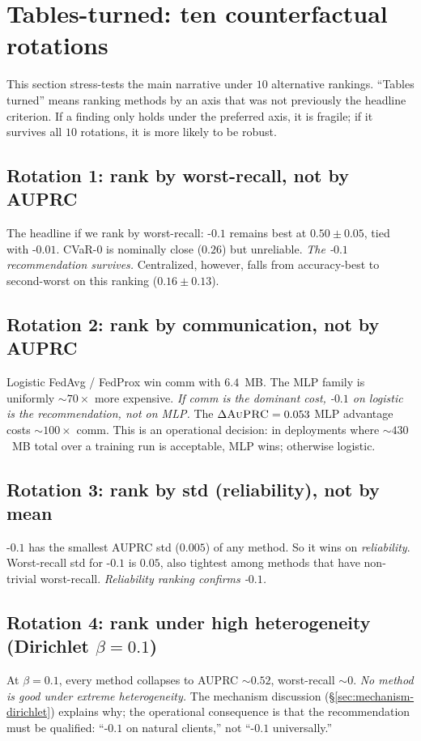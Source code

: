 \section{Tables-turned: ten counterfactual rotations}
\label{sec:tables-turned}

This section stress-tests the main narrative under $10$ alternative rankings.
``Tables turned'' means ranking methods by an axis that was not previously the
headline criterion. If a finding only holds under the preferred axis, it is
fragile; if it survives all $10$ rotations, it is more likely to be robust.

\subsection{Rotation 1: rank by worst-recall, not by AUPRC}
The headline if we rank by worst-recall: \fedprox{}-$0.1$ remains best at
$0.50 \pm 0.05$, tied with \fedprox{}-$0.01$. CVaR-$0$ is nominally close
($0.26$) but unreliable. \emph{The \fedprox{}-$0.1$ recommendation survives.}
Centralized, however, falls from accuracy-best to second-worst on this
ranking ($0.16 \pm 0.13$).

\subsection{Rotation 2: rank by communication, not by AUPRC}
Logistic FedAvg / FedProx win comm with $6.4$~MB. The MLP family is uniformly
$\sim 70\!\times$ more expensive. \emph{If comm is the dominant cost,
\fedprox{}-$0.1$ on logistic is the recommendation, not on MLP.} The
$\Delta\textsc{AuPRC}{} = 0.053$ MLP advantage costs $\sim 100\!\times$ comm. This is
an operational decision: in deployments where $\sim$$430$~MB total over a
training run is acceptable, MLP wins; otherwise logistic.

\subsection{Rotation 3: rank by std (reliability), not by mean}
\fedprox{}-$0.1$ has the smallest AUPRC std ($0.005$) of any method. So it
wins on \emph{reliability}. Worst-recall std for \fedprox{}-$0.1$ is $0.05$,
also tightest among methods that have non-trivial worst-recall.
\emph{Reliability ranking confirms \fedprox{}-$0.1$.}

\subsection{Rotation 4: rank under high heterogeneity (Dirichlet $\beta\!=\!0.1$)}
At $\beta \!=\! 0.1$, every method collapses to AUPRC $\sim 0.52$, worst-recall
$\sim 0$. \emph{No method is good under extreme heterogeneity.} The mechanism
discussion (\S\ref{sec:mechanism-dirichlet}) explains why; the operational
consequence is that the recommendation must be qualified: ``\fedprox{}-$0.1$
on natural clients,'' not ``\fedprox{}-$0.1$ universally.''

